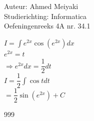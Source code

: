 \documentclass[a4paper]{article}
\begin{document}
  
\noindent \large Auteur: Ahmed Meiyaki \\
\noindent \large Studierichting: Informatica\\
\noindent \large Oefeningenreeks 4A nr. 34.1\\

\medskip

\normalsize

$I = \displaystyle\int e^{2x} \cos \left(e^{2x}\right) dx $\\

$ e^{2x} = t $\\

$\Rightarrow e^{2x}dx = \dfrac{1}{2}dt $\\

$I = \dfrac{1}{2} \displaystyle\int \cos tdt $\\

$= \dfrac{1}{2} \sin \left(e^{2x}\right) + C $\\







\begin{thebibliography}{999}
\end{thebibliography}
\end{document}
